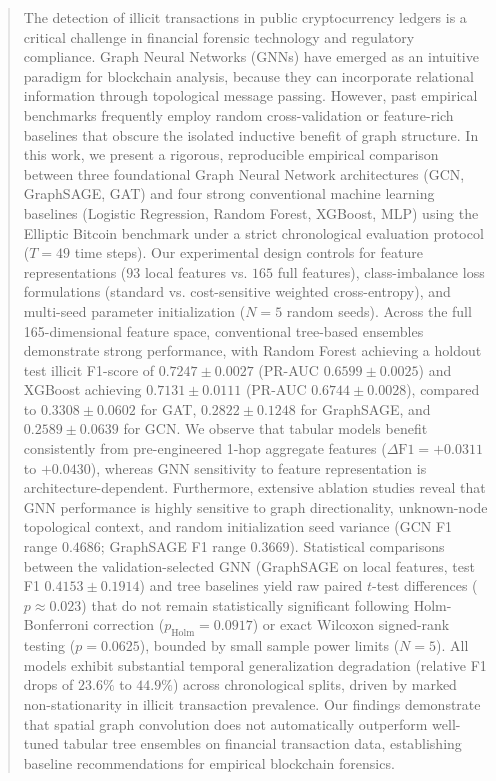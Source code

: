 \documentclass[conference]{IEEEtran}
\begin{document}
\begin{abstract}
The detection of illicit transactions in public cryptocurrency ledgers is a critical challenge in financial forensic technology and regulatory compliance. Graph Neural Networks (GNNs) have emerged as an intuitive paradigm for blockchain analysis, because they can incorporate relational information through topological message passing. However, past empirical benchmarks frequently employ random cross-validation or feature-rich baselines that obscure the isolated inductive benefit of graph structure. In this work, we present a rigorous, reproducible empirical comparison between three foundational Graph Neural Network architectures (GCN, GraphSAGE, GAT) and four strong conventional machine learning baselines (Logistic Regression, Random Forest, XGBoost, MLP) using the Elliptic Bitcoin benchmark under a strict chronological evaluation protocol ($T = 49$ time steps). Our experimental design controls for feature representations ($93$ local features vs. $165$ full features), class-imbalance loss formulations (standard vs. cost-sensitive weighted cross-entropy), and multi-seed parameter initialization ($N = 5$ random seeds). Across the full 165-dimensional feature space, conventional tree-based ensembles demonstrate strong performance, with Random Forest achieving a holdout test illicit F1-score of $0.7247 \pm 0.0027$ (PR-AUC $0.6599 \pm 0.0025$) and XGBoost achieving $0.7131 \pm 0.0111$ (PR-AUC $0.6744 \pm 0.0028$), compared to $0.3308 \pm 0.0602$ for GAT, $0.2822 \pm 0.1248$ for GraphSAGE, and $0.2589 \pm 0.0639$ for GCN. We observe that tabular models benefit consistently from pre-engineered 1-hop aggregate features ($\Delta\text{F1} = +0.0311$ to $+0.0430$), whereas GNN sensitivity to feature representation is architecture-dependent. Furthermore, extensive ablation studies reveal that GNN performance is highly sensitive to graph directionality, unknown-node topological context, and random initialization seed variance (GCN F1 range $0.4686$; GraphSAGE F1 range $0.3669$). Statistical comparisons between the validation-selected GNN (GraphSAGE on local features, test F1 $0.4153 \pm 0.1914$) and tree baselines yield raw paired $t$-test differences ($p \approx 0.023$) that do not remain statistically significant following Holm-Bonferroni correction ($p_{\text{Holm}} = 0.0917$) or exact Wilcoxon signed-rank testing ($p = 0.0625$), bounded by small sample power limits ($N=5$). All models exhibit substantial temporal generalization degradation (relative F1 drops of $23.6\%$ to $44.9\%$) across chronological splits, driven by marked non-stationarity in illicit transaction prevalence. Our findings demonstrate that spatial graph convolution does not automatically outperform well-tuned tabular tree ensembles on financial transaction data, establishing baseline recommendations for empirical blockchain forensics.
\end{abstract}
\end{document}
